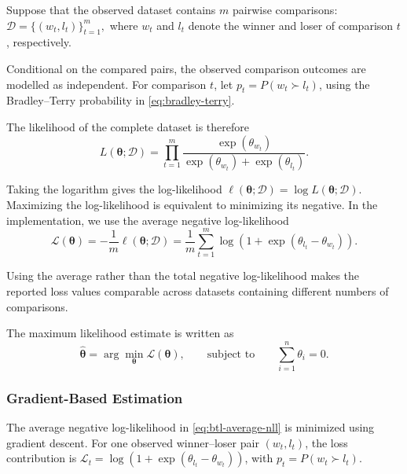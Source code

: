 \documentclass[11pt,a4paper]{article}
\begin{document}
Suppose that the observed dataset contains \(m\) pairwise comparisons:
\(\mathcal{D} = \{(w_t,l_t)\}_{t=1}^{m},\)
where \(w_t\) and \(l_t\) denote the winner and loser of comparison
\(t\), respectively.

Conditional on the compared pairs, the observed comparison outcomes are modelled as independent. For comparison $t$, let $p_t=P(w_t\succ l_t)$, using the Bradley--Terry probability in \cref{eq:bradley-terry}.

The likelihood of the complete dataset is therefore
\begin{equation}
    L(\boldsymbol{\theta};\mathcal{D})
    =
    \prod_{t=1}^{m}
    \frac{\exp(\theta_{w_t})}
    {\exp(\theta_{w_t})+\exp(\theta_{l_t})}.
    \label{eq:btl-likelihood}
\end{equation}

Taking the logarithm gives the log-likelihood $\ell(\boldsymbol{\theta};\mathcal{D})=\log L(\boldsymbol{\theta};\mathcal{D})$. Maximizing the log-likelihood is equivalent to minimizing its negative. In the implementation, we use the average negative log-likelihood
\begin{equation}
    \mathcal{L}(\boldsymbol{\theta})
    =-\frac{1}{m}\ell(\boldsymbol{\theta};\mathcal{D})
    =\frac{1}{m}\sum_{t=1}^{m}
    \log\left(1+\exp(\theta_{l_t}-\theta_{w_t})\right).
    \label{eq:btl-average-nll}
\end{equation}

Using the average rather than the total negative log-likelihood makes
the reported loss values comparable across datasets containing
different numbers of comparisons.

The maximum likelihood estimate is written as
\begin{equation}
    \widehat{\boldsymbol{\theta}}
    =
    \arg\min_{\boldsymbol{\theta}}
    \mathcal{L}(\boldsymbol{\theta}),
    \qquad
    \text{subject to}
    \qquad
    \sum_{i=1}^{n}\theta_i=0.
    \label{eq:btl-mle}
\end{equation}


\subsubsection[Gradient-based estimation]{Gradient-Based Estimation}

The average negative log-likelihood in
\cref{eq:btl-average-nll} is minimized using gradient descent. For one observed winner--loser pair $(w_t,l_t)$, the loss contribution is $\mathcal{L}_t=\log(1+\exp(\theta_{l_t}-\theta_{w_t}))$, with $p_t=P(w_t\succ l_t)$.
\end{document}
